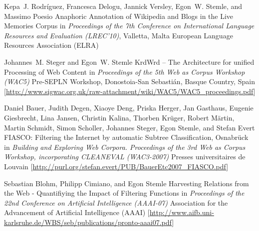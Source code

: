 \documentclass[11pt,a4paper]{moderncv}
\begin{document}
    {Kepa~J. Rodr{\'i}guez, Francesca Delogu, Jannick Versley, Egon~W. Stemle, and Massimo Poesio}
    {Anaphoric Annotation of Wikipedia and Blogs in the Live Memories Corpus}
    {\small in {\em Proceedings of the 7th Conference on International Language Resources and Evaluation (LREC'10)}, Valletta, Malta}
    {\small European Language Resources Association (ELRA)}
    {}

    {Johannes~M. Steger and Egon~W. Stemle}
    {{KrdWrd} -- The Architecture for unified Processing of Web Content}
    {\small in {\em Proceedings of the 5th Web as Corpus Workshop (WAC5)}}
    {\small Pre-SEPLN Workshop, Donostoia-San Sebasti{\'a}n, Basque Country, Spain}
    {[\url{http://www.sigwac.org.uk/raw-attachment/wiki/WAC5/WAC5_proceedings.pdf}]}

    {Daniel Bauer, Judith Degen, Xiaoye Deng, Priska Herger, Jan Gasthaus, Eugenie Giesbrecht, Lina Jansen, Christin Kalina, Thorben Kr{\"u}ger, Robert M{\"a}rtin, Martin Schmidt, Simon Scholler, Johannes Steger, Egon Stemle, and Stefan Evert}
    {FIASCO: Filtering the Internet by automatic Subtree Classification, Osnabr{\"u}ck}
    {\small in {\em Building and Exploring Web Corpora. Proceedings of the 3rd Web as Corpus Workshop, incorporating CLEANEVAL (WAC3-2007)}}
    {\small Presses universitaires de Louvain}
    {[\url{http://purl.org/stefan.evert/PUB/BauerEtc2007_FIASCO.pdf}]}

    {Sebastian Blohm, Philipp Cimiano, and Egon Stemle}
    {Harvesting Relations from the Web - Quantifiying the Impact of Filtering Functions}
    {\small in {\em Proceedings of the 22nd Conference on Artificial Intelligence (AAAI-07)}}
    {\small Association for the Advancement of Artificial Intelligence (AAAI)}
    {[\url{http://www.aifb.uni-karlsruhe.de/WBS/seb/publications/pronto-aaai07.pdf}]}
\end{document}
